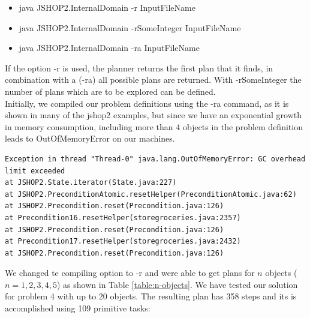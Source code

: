 \documentclass[paper=a4, fontsize=11pt]{scrartcl}
\begin{document}
 \begin{itemize}
 	\item java JSHOP2.InternalDomain -r InputFileName
 	\item java JSHOP2.InternalDomain -rSomeInteger InputFileName
 	\item java JSHOP2.InternalDomain -ra InputFileName
 \end{itemize}
 
 If the option -r is used, the planner returns the first plan that it finds, in combination with a (-ra) all possible plans are returned. With -rSomeInteger the number of plans which are to be explored can be defined. \\
 
 Initially, we compiled our problem definitions using the -ra command, as it is shown in many of the jshop2 examples, but since we have an exponential growth in memory consumption, including more than 4 objects in the problem definition leads to OutOfMemoryError on our machines. \\


\begin{lstlisting}
Exception in thread "Thread-0" java.lang.OutOfMemoryError: GC overhead limit exceeded
at JSHOP2.State.iterator(State.java:227)
at JSHOP2.PreconditionAtomic.resetHelper(PreconditionAtomic.java:62)
at JSHOP2.Precondition.reset(Precondition.java:126)
at Precondition16.resetHelper(storegroceries.java:2357)
at JSHOP2.Precondition.reset(Precondition.java:126)
at Precondition17.resetHelper(storegroceries.java:2432)
at JSHOP2.Precondition.reset(Precondition.java:126)

\end{lstlisting}

\vspace{5mm}

We changed te compiling option to -r and were able to get plans for $n$ objects ($n= 1, 2, 3, 4, 5$) as shown in Table \ref{table:n-objects}. We have tested our solution for problem 4 with up to 20 objects. The resulting plan has 358 steps and its is accomplished using 109 primitive tasks: \\
\end{document}

